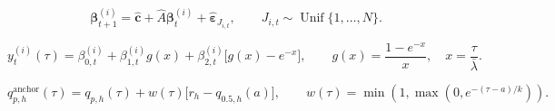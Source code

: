 \[
\boldsymbol{\beta}^{(i)}_{t+1}
=\widehat{\boldsymbol{c}}+\widehat{A}\boldsymbol{\beta}^{(i)}_t
+\widehat{\boldsymbol{\varepsilon}}_{J_{i,t}},
\qquad J_{i,t}\sim\operatorname{Unif}\{1,\ldots,N\}.
\]

\[
y^{(i)}_t(\tau)=\beta^{(i)}_{0,t}
+\beta^{(i)}_{1,t}g(x)
+\beta^{(i)}_{2,t}\bigl[g(x)-e^{-x}\bigr],
\qquad g(x)=\frac{1-e^{-x}}{x},\quad x=\frac{\tau}{\bar\lambda}.
\]

\[
q^{\mathrm{anchor}}_{p,h}(\tau)=q_{p,h}(\tau)
+w(\tau)\bigl[r_h-q_{0.5,h}(a)\bigr],
\qquad w(\tau)=\min\!\left(1,\max\!\left(0,e^{-(\tau-a)/k}\right)\right).
\]
